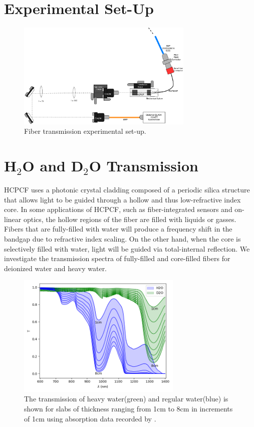 \section{Experimental Set-Up}
\begin{figure}[!htb]
	\centering
	\includegraphics[width=0.75\textwidth]{./Figures/fiberfilling/scs_setup.png}
	\caption{Fiber transmission experimental set-up.}
	\label{fig:filling exp}
\end{figure}


\section{H${}_2$O and D${}_2$O Transmission}
HCPCF uses a photonic crystal cladding composed of a periodic silica structure that allows light to be guided through a hollow and thus low-refractive index core.
In some applications of HCPCF, such as fiber-integrated sensors and on-linear optics, the hollow regions of the fiber are filled with liquids or gasses.
Fibers that are fully-filled with water will produce a frequency shift in the bandgap due to refractive index scaling\cite{antonopoulos}. On the other hand, when the core is selectively filled with water, light will be guided via total-internal reflection. We investigate the transmission spectra of fully-filled and core-filled fibers for deionized water and heavy water.
\begin{figure}[!htb]
	\centering
	\includegraphics[width=0.7\textwidth]{./Figures/fiberfilling/water_transmission/water_transmission.png}
	\caption{The transmission of heavy water(green) and regular water(blue) is shown for slabs of thickness ranging from 1cm to 8cm in increments of 1cm using absorption data recorded by \cite{kedenburg}. }
	\label{fig:water transmission}
\end{figure}
\clearpage

